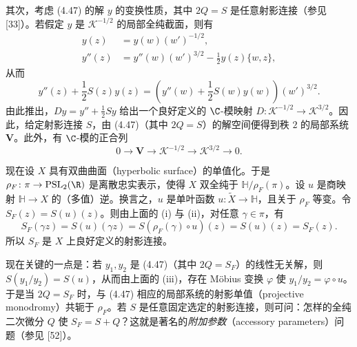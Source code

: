 其次，考虑 (4.47) 的解 $y$ 的变换性质，其中 $2Q=S$ 是任意射影连接（参见 [33]）。若假定 $y$ 是 $\mathcal{K}^{-1/2}$ 的局部全纯截面，则有
\[
\begin{aligned}
y(z)&=y(w)(w')^{-1/2},\\
y''(z)&=y''(w)(w')^{3/2}-\frac{1}{2}y(z)\{w,z\},
\end{aligned}
\]
从而
\[
y''(z)+\frac{1}{2}S(z)y(z)=\left(y''(w)+\frac{1}{2}S(w)y(w)\right)(w')^{3/2}.
\]
由此推出，$Dy=y''+\frac{1}{2}Sy$ 给出一个良好定义的 $\C$-模映射 $D\colon\mathcal{K}^{-1/2}\to\mathcal{K}^{3/2}$。因此，给定射影连接 $S$，由 (4.47)（其中 $2Q=S$）的解空间便得到秩 $2$ 的局部系统 $\mathbf{V}$。此外，有 $\C$-模的正合列
\[
0\longrightarrow\mathbf{V}\longrightarrow\mathcal{K}^{-1/2}\longrightarrow\mathcal{K}^{3/2}\longrightarrow0.
\]

现在设 $X$ 具有双曲曲面（hyperbolic surface）的单值化。于是 $\rho_F\colon\pi\to\mathrm{PSL}_2(\R)$ 是离散忠实表示，使得 $X$ 双全纯于 $\mathbb{H}/\rho_F(\pi)$。设 $u$ 是商映射 $\mathbb{H}\to X$ 的（多值）逆。换言之，$u$ 是单叶函数 $u\colon\tilde X\to\mathbb{H}$，且关于 $\rho_F$ 等变。令 $S_F(z)=S(u)(z)$。则由上面的 (i) 与 (ii)，对任意 $\gamma\in\pi$，有
\[
S_F(\gamma z)=S(u)(\gamma z)=S(\rho_F(\gamma)\circ u)(z)=S(u)(z)=S_F(z).
\]
所以 $S_F$ 是 $X$ 上良好定义的射影连接。

现在关键的一点是：若 $y_1,y_2$ 是 (4.47)（其中 $2Q=S_F$）的线性无关解，则 $S(y_1/y_2)=S(u)$，从而由上面的 (iii)，存在 Möbius 变换 $\varphi$ 使 $y_1/y_2=\varphi\circ u$。于是当 $2Q=S_F$ 时，与 (4.47) 相应的局部系统的射影单值（projective monodromy）共轭于 $\rho_F$。若 $S$ 是任意固定选定的射影连接，则可问：怎样的全纯二次微分 $Q$ 使 $S_F=S+Q$？这就是著名的\emph{附加参数}（accessory parameters）问题（参见 [52]）。

